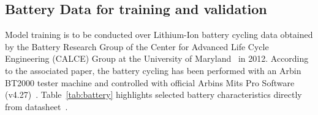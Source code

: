 \subsection{Battery Data for training and validation} \label{subsec:b_data}
%
Model training is to be conducted over Lithium-Ion battery cycling data obtained by the Battery Research Group of the Center for Advanced Life Cycle Engineering (CALCE) Group at the University of Maryland~\cite{noauthor_calce_2017} in 2012.
According to the associated paper, the battery cycling has been performed with an Arbin BT2000 tester machine and controlled with official Arbins Mits Pro Software (v4.27)~\cite{xing_state_2014}.
\mbox{Table~\ref{tab:battery}} highlights selected battery characteristics directly from datasheet~\cite{noauthor_anr26650m1a}.
\begin{table}[ht]
    \renewcommand{\arraystretch}{1.3}
    \caption{Battery characteristics}
    \centering
    \label{tab:battery}
\end{table}


